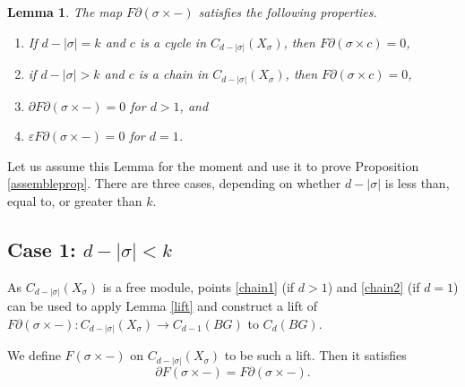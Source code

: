 \documentclass[11pt,letterpaper]{amsart}
\newtheorem{lemma}[theorem]{Lemma}
\begin{document}
\begin{lemma}
\label{vanishlemma}
The map 
$
F\partial(\sigma\times-)%
$
satisfies the following properties.
\begin{enumerate}[label=$\mathrm{(\roman*)}$]
\item\label{cycle} 
If $d-|\sigma|=k$ and $c$ is a cycle in $C_{d-|\sigma|}(X_{\sigma})$, then $F\partial(\sigma\times c)=0$, 
\item\label{chainvanish} 
if $d-|\sigma|>k$ and $c$ is a chain in $C_{d-|\sigma|}(X_{\sigma})$, then $F\partial(\sigma\times c)=0$, 
\item\label{chain1} 
$\partial F\partial(\sigma\times-)=0$ for $d>1$, and
\item\label{chain2}
$\varepsilon F\partial(\sigma\times-)=0$ for $d=1$. 
\end{enumerate}
\end{lemma}
Let us assume this Lemma for the moment and use it to prove Proposition \ref{assembleprop}. There are three cases, depending on whether $d-|\sigma|$ is less than, equal to, or greater than $k$.

\subsection*{Case 1: $d-|\sigma|<k$} As $C_{d-|\sigma|}(X_{\sigma})$ is a free module, points \ref{chain1} (if $d>1$) and \ref{chain2} (if $d=1$) can be used to apply Lemma \ref{lift} and construct a lift of $F\partial(\sigma\times-):C_{d-|\sigma|}(X_{\sigma})\rightarrow C_{d-1}(BG)$ to $C_d(BG)$. %


We define $F(\sigma\times -)$ on $C_{d-|\sigma|}(X_{\sigma})$ to be such a lift. Then it satisfies
\begin{equation}
\tag{**}
\label{chain}
\partial F(\sigma\times -)=F\partial(\sigma\times -).
\end{equation}
\end{document}
